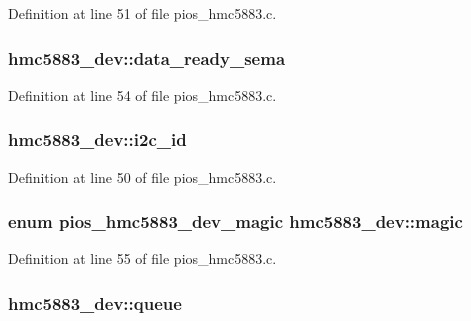 Definition at line 51 of file pios\-\_\-hmc5883.\-c.

\hypertarget{structhmc5883__dev_a391988bf3eb9db5a73d9c8db759b1cff}{
\subsubsection[{data\-\_\-ready\-\_\-sema}]{ hmc5883\-\_\-dev\-::data\-\_\-ready\-\_\-sema}}\label{structhmc5883__dev_a391988bf3eb9db5a73d9c8db759b1cff}


Definition at line 54 of file pios\-\_\-hmc5883.\-c.

\hypertarget{structhmc5883__dev_aebf7ac3174874aa4322f25c242c96cbc}{
\subsubsection[{i2c\-\_\-id}]{ hmc5883\-\_\-dev\-::i2c\-\_\-id}}\label{structhmc5883__dev_aebf7ac3174874aa4322f25c242c96cbc}


Definition at line 50 of file pios\-\_\-hmc5883.\-c.

\hypertarget{structhmc5883__dev_a035551dfd62138e07853dd71dfc252c4}{
\subsubsection[{magic}]{\setlength{\rightskip}{0pt plus 5cm}enum {\bf pios\-\_\-hmc5883\-\_\-dev\-\_\-magic} hmc5883\-\_\-dev\-::magic}}\label{structhmc5883__dev_a035551dfd62138e07853dd71dfc252c4}


Definition at line 55 of file pios\-\_\-hmc5883.\-c.

\hypertarget{structhmc5883__dev_adc55a1a3ea4c43196bf7c411309485ac}{
\subsubsection[{queue}]{ hmc5883\-\_\-dev\-::queue}}\label{structhmc5883__dev_adc55a1a3ea4c43196bf7c411309485ac}



